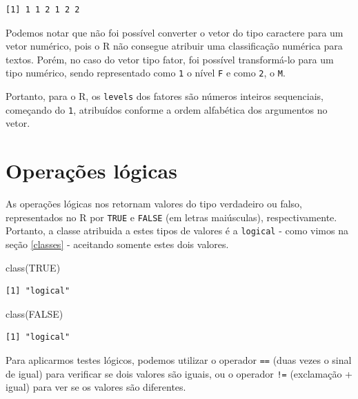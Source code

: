 \documentclass[
  brazilian,
]{book}
\newenvironment{Shaded}{\begin{snugshade}}{\end{snugshade}}
\newcommand{\ConstantTok}[1]{\textcolor[rgb]{0.00,0.00,0.00}{#1}}
\newcommand{\FunctionTok}[1]{\textcolor[rgb]{0.00,0.00,0.00}{#1}}
\newcommand{\NormalTok}[1]{#1}
\begin{document}
\begin{verbatim}
[1] 1 1 2 1 2 2
\end{verbatim}

Podemos notar que não foi possível converter o vetor do tipo caractere para um vetor numérico, pois o R não consegue atribuir uma classificação numérica para textos. Porém, no caso do vetor tipo fator, foi possível transformá-lo para um tipo numérico, sendo representado como \texttt{1} o nível \texttt{F} e como \texttt{2}, o \texttt{M}.

Portanto, para o R, os \texttt{levels} dos fatores são números inteiros sequenciais, começando do \texttt{1}, atribuídos conforme a ordem alfabética dos argumentos no vetor.

\hypertarget{logica}{%
\section{Operações lógicas}\label{logica}}

As operações lógicas nos retornam valores do tipo verdadeiro ou falso, representados no R por \texttt{TRUE} e \texttt{FALSE} (em letras maiúsculas), respectivamente. Portanto, a classe atribuida a estes tipos de valores é a \texttt{logical} - como vimos na seção \ref{classes} - aceitando somente estes dois valores.

\begin{Shaded}
\begin{Highlighting}[]
\FunctionTok{class}\NormalTok{(}\ConstantTok{TRUE}\NormalTok{)}
\end{Highlighting}
\end{Shaded}

\begin{verbatim}
[1] "logical"
\end{verbatim}

\begin{Shaded}
\begin{Highlighting}[]
\FunctionTok{class}\NormalTok{(}\ConstantTok{FALSE}\NormalTok{)}
\end{Highlighting}
\end{Shaded}

\begin{verbatim}
[1] "logical"
\end{verbatim}

Para aplicarmos testes lógicos, podemos utilizar o operador \texttt{==} (duas vezes o sinal de igual) para verificar se dois valores são iguais, ou o operador \texttt{!=} (exclamação + igual) para ver se os valores são diferentes.
\end{document}
